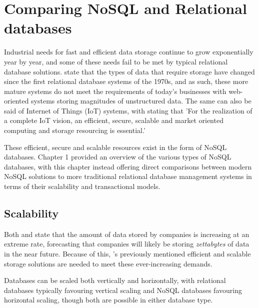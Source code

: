 \chapter{Comparing NoSQL and Relational databases} 



Industrial needs for fast and efficient data storage continue to grow exponentially year by year, and some of these needs fail to be met 
by typical relational database solutions. \textcite{corbelliniPersistingBigdataNoSQL2017} state that the types of data that require storage 
have changed since the first relational database systems of the 1970s, and as such, these more mature systems do not meet the requirements of
today's businesses with web-oriented systems storing magnitudes of unstructured data. The same can also be said of Internet of Things 
(IoT) systems, with  \textcite{gubbiInternetThingsIoT2013} stating that 'For the realization of a complete IoT vision, an efficient, secure,
scalable and market oriented computing and storage resourcing is essential.'

\para These efficient, secure and scalable resources exist in the form of NoSQL databases. Chapter 1 provided an overview of the various 
types of NoSQL databases, with this chapter instead offering direct comparisons between modern NoSQL solutions to more traditional relational 
database management systems in terms of their scalability and transactional models. 


\section{Scalability}
Both \textcite{ganiSurveyIndexingTechniques2016} and \textcite{katalBigDataIssues2013} state that the amount of data stored by companies 
is increasing at an extreme rate, forecasting that companies will likely be storing \textit{zettabytes} of data in the near future.
Because of this, \textcite{gubbiInternetThingsIoT2013}'s previously mentioned efficient and scalable storage solutions are needed to meet 
these ever-increasing demands.

\para Databases can be scaled both vertically and horizontally, with relational databases typically favouring vertical scaling and NoSQL 
databases favouring horizontal scaling, though both are possible in either database type. 


